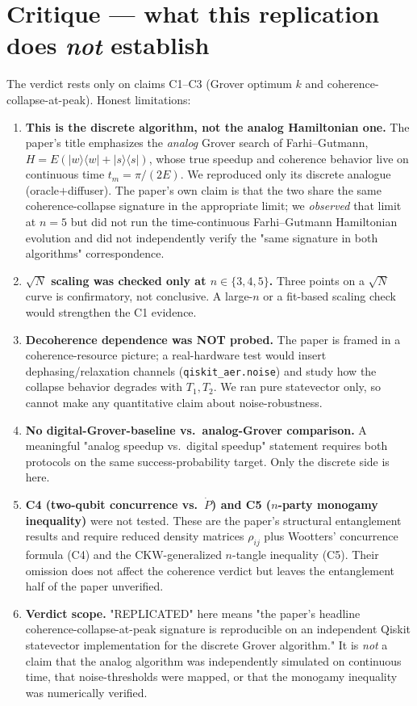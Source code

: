 \documentclass[11pt]{article}
\begin{document}
\section{Critique --- what this replication does \emph{not} establish}

The verdict rests only on claims C1--C3 (Grover optimum $k$ and
coherence-collapse-at-peak). Honest limitations:

\begin{enumerate}
\item \textbf{This is the discrete algorithm, not the analog Hamiltonian
      one.} The paper's title emphasizes the \emph{analog} Grover
      search of Farhi--Gutmann,
      $H = E(|w\rangle\langle w| + |s\rangle\langle s|)$, whose true
      speedup and coherence behavior live on continuous time
      $t_m = \pi / (2E)$. We reproduced only its discrete analogue
      (oracle$+$diffuser). The paper's own claim is that the two share
      the same coherence-collapse signature in the appropriate limit;
      we \emph{observed} that limit at $n{=}5$ but did not run the
      time-continuous Farhi--Gutmann Hamiltonian evolution and did not
      independently verify the "same signature in both algorithms"
      correspondence.
\item \textbf{$\sqrt{N}$ scaling was checked only at $n\in\{3,4,5\}$.}
      Three points on a $\sqrt{N}$ curve is confirmatory, not
      conclusive. A large-$n$ or a fit-based scaling check would
      strengthen the C1 evidence.
\item \textbf{Decoherence dependence was NOT probed.} The paper is
      framed in a coherence-resource picture; a real-hardware test
      would insert dephasing/relaxation channels
      (\texttt{qiskit\_aer.noise}) and study how the collapse behavior
      degrades with $T_1, T_2$. We ran pure statevector only, so
      cannot make any quantitative claim about noise-robustness.
\item \textbf{No digital-Grover-baseline vs.\ analog-Grover comparison.}
      A meaningful "analog speedup vs.\ digital speedup" statement
      requires both protocols on the same success-probability target.
      Only the discrete side is here.
\item \textbf{C4 (two-qubit concurrence vs.\ $\dot P$) and C5
      ($n$-party monogamy inequality)} were not tested. These are the
      paper's structural entanglement results and require reduced
      density matrices $\rho_{ij}$ plus Wootters' concurrence formula
      (C4) and the CKW-generalized $n$-tangle inequality (C5). Their
      omission does not affect the coherence verdict but leaves the
      entanglement half of the paper unverified.
\item \textbf{Verdict scope.} "REPLICATED" here means "the paper's
      headline coherence-collapse-at-peak signature is reproducible on
      an independent Qiskit statevector implementation for the
      discrete Grover algorithm." It is \emph{not} a claim that the
      analog algorithm was independently simulated on continuous
      time, that noise-thresholds were mapped, or that the monogamy
      inequality was numerically verified.
\end{enumerate}


\end{document}
